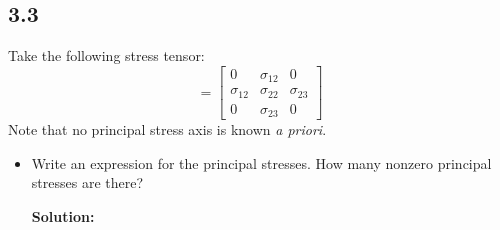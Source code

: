 \documentclass[12pt]{article}
\begin{document}
\subsection{3.3}
Take the following stress tensor:
\begin{equation}
	[\sigma] = \begin{bmatrix}
		0           & \sigma_{12} & 0           \\
		\sigma_{12} & \sigma_{22} & \sigma_{23} \\
		0           & \sigma_{23} & 0
	\end{bmatrix}
\end{equation}
Note that no principal stress axis is known \textit{a priori}.
\begin{itemize}
	\item Write an expression for the principal stresses. How many nonzero principal stresses are there?

	      \textbf{Solution:}


\end{itemize}
\end{document}
